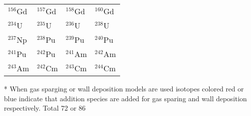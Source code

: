 \begin{table}[htbp]
\begin{threeparttable}
\begin{tabular}{C{3cm}C{3cm}C{3cm}C{3cm}}
    ${}^{156}$Gd & ${}^{157}$Gd & ${}^{158}$Gd & ${}^{160}$Gd \\
    ${}^{234}$U & ${}^{235}$U & ${}^{236}$U & ${}^{238}$U \\  
    ${}^{237}$Np & ${}^{238}$Pu & ${}^{239}$Pu & ${}^{240}$Pu \\
    ${}^{241}$Pu & ${}^{242}$Pu & ${}^{241}$Am & ${}^{242}$Am \\
    ${}^{243}$Am & ${}^{242}$Cm & ${}^{243}$Cm & ${}^{244}$Cm \\
    \hline
    \end{tabular}
    \begin{tablenotes}\footnotesize
    \item[*] When gas sparging or wall deposition models are used isotopes colored red or blue indicate that addition species are added for gas sparing and wall deposition respectively. Total 72 or 86 
    
   \end{tablenotes}
   \end{threeparttable}
\end{table}

